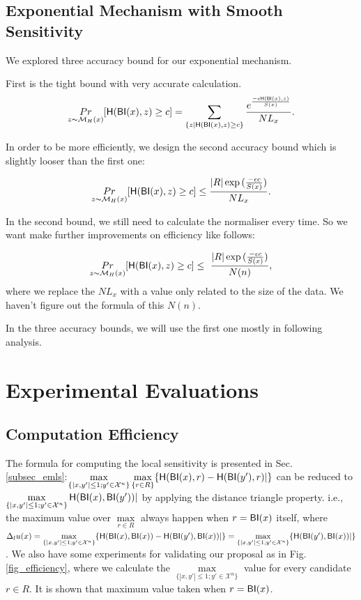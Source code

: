 \subsection{Exponential Mechanism with Smooth Sensitivity}
We explored three accuracy bound for our exponential mechanism.

First is the tight bound with very accurate calculation.
\begin{equation*}
\underset{z \thicksim \mathcal{M}_H(x)}{Pr}[ \mathsf{H}(\mathsf{BI}(x), z) \geq c] = \sum\limits_{\{z | \mathsf{H}(\mathsf{BI}(x), z) \geq c\}} \frac{e^{\frac{- \epsilon \mathsf{H}(\mathsf{BI}(x), z)}{S(x)}}}{NL_x}.
\end{equation*}

In order to be more efficiently, we design the second accuracy bound which is slightly looser than the first one:

\begin{equation*}
\underset{z \thicksim \mathcal{M}_H(x)}{Pr}[ \mathsf{H}(\mathsf{BI}(x), z) \geq c] \leq \frac{|R| \exp{(\frac{- \epsilon c}{S(x)}})}{NL_x}.
\end{equation*}

In the second bound, we still need to calculate the normaliser every time. So we want make further improvements on efficiency like follows:

\begin{equation*}
\underset{z \thicksim \mathcal{M}_H(x)}{Pr}[ \mathsf{H}(\mathsf{BI}(x), z) \geq c] \leq \ \frac{|R| \exp{(\frac{- \epsilon c}{S(x)}})}{N(n)},
\end{equation*}
where we replace the $NL_x$ with a value only related to the size of the data. We haven't figure out the formula of this $N(n)$.

In the three accuracy bounds, we will use the first one mostly in following analysis.




\section{Experimental Evaluations}
\subsection{Computation Efficiency}
The formula for computing the local sensitivity is presented in Sec. \ref{subsec_emls}:$\max\limits_{\{|x,y'| \leq 1; y'\in \mathcal{X}^n\}}\max\limits_{\{r\in R\}} \{\mathsf{H}(\mathsf{BI}(x), r) - \mathsf{H}(\mathsf{BI}(y'), r)|\}$ can be reduced to $\max\limits_{\{|x,y'| \leq 1;y'\in \mathcal{X}^n\}}\mathsf{H}(\mathsf{BI}(x), \mathsf{BI}(y'))|$ by applying the distance triangle property. i.e., the maximum value over $\max\limits_{r \in R}$ always happen when $r = \mathsf{BI}(x)$ itself, where $\Delta_{l}u(x) = \max\limits_{\{|x,y'| \leq 1;y'\in \mathcal{X}^n\}} \{\mathsf{H}(\mathsf{BI}(x), \mathsf{BI}(x)) - \mathsf{H}(\mathsf{BI}(y'), \mathsf{BI}(x))|\} = \max\limits_{\{|x,y'| \leq 1;y'\in \mathcal{X}^n\}} \{\mathsf{H}(\mathsf{BI}(y'), \mathsf{BI}(x))|\}$. We also have some experiments for validating our proposal as in Fig. \ref{fig_efficiency}, where we calculate the $\max\limits_{\{|x,y'| \leq 1;y'\in \mathcal{X}^n\}}$ value for every candidate $r \in R$. It is shown that maximum value taken when  $r = \mathsf{BI}(x)$.

